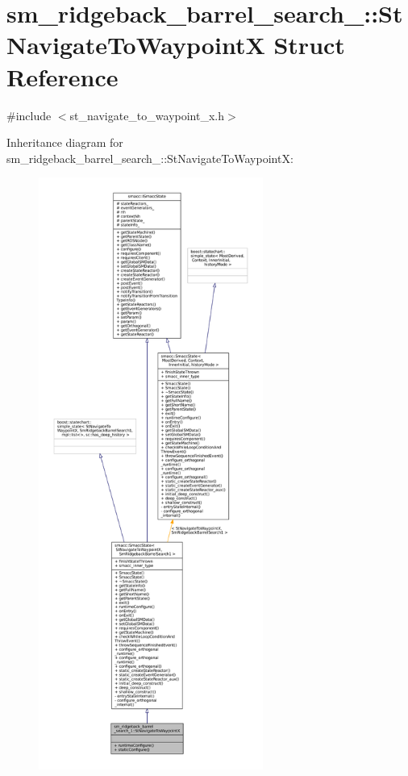 \hypertarget{structsm__ridgeback__barrel__search__1_1_1StNavigateToWaypointX}{}\section{sm\+\_\+ridgeback\+\_\+barrel\+\_\+search\+\_\+:\+:St\+Navigate\+To\+WaypointX Struct Reference}
\label{structsm__ridgeback__barrel__search__1_1_1StNavigateToWaypointX}


{\ttfamily \#include $<$st\+\_\+navigate\+\_\+to\+\_\+waypoint\+\_\+x.\+h$>$}



Inheritance diagram for sm\+\_\+ridgeback\+\_\+barrel\+\_\+search\+\_\+:\+:St\+Navigate\+To\+WaypointX\+:
\nopagebreak
\begin{figure}[H]
\begin{center}
\leavevmode
\includegraphics[height=550pt]{structsm__ridgeback__barrel__search__1_1_1StNavigateToWaypointX__inherit__graph}
\end{center}
\end{figure}


